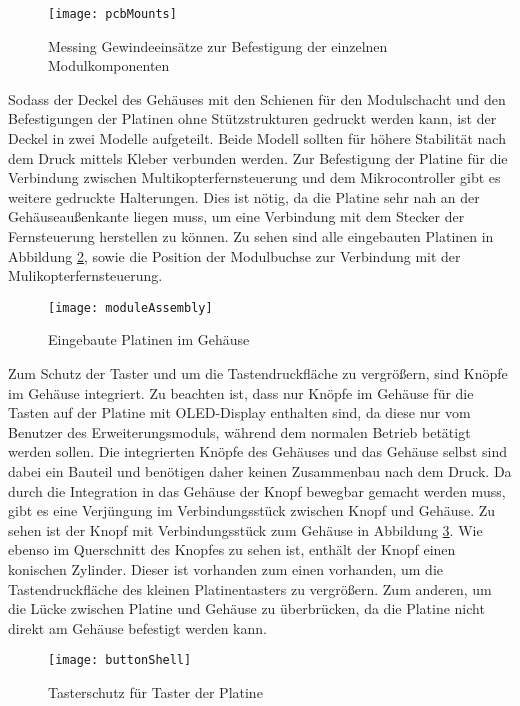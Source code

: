\begin{figure}[h]
    \centering
    \texttt{[image: pcbMounts]}
    \caption{Messing Gewindeeinsätze zur Befestigung der einzelnen Modulkomponenten}
    \label{fig:pcbMounts}
\end{figure}

Sodass der Deckel des Gehäuses mit den Schienen für den Modulschacht und den Befestigungen der Platinen ohne Stützstrukturen gedruckt werden kann, ist der Deckel in zwei Modelle aufgeteilt. Beide Modell sollten für höhere Stabilität nach dem Druck mittels Kleber verbunden werden. Zur Befestigung der Platine für die Verbindung zwischen Multikopterfernsteuerung und dem Mikrocontroller gibt es weitere gedruckte Halterungen. Dies ist nötig, da die Platine sehr nah an der Gehäuseaußenkante liegen muss, um eine Verbindung mit dem Stecker der Fernsteuerung herstellen zu können. Zu sehen sind alle eingebauten Platinen in Abbildung \ref{fig:moduleAssembly}, sowie die Position der Modulbuchse zur Verbindung mit der Mulikopterfernsteuerung.

\begin{figure}[h]
    \centering
    \texttt{[image: moduleAssembly]}
    \caption{Eingebaute Platinen im Gehäuse}
    \label{fig:moduleAssembly}
\end{figure}

Zum Schutz der Taster und um die Tastendruckfläche zu vergrößern, sind Knöpfe im Gehäuse integriert. Zu beachten ist, dass nur Knöpfe im Gehäuse für die Tasten auf der Platine mit \acs{OLED}-Display enthalten sind, da diese nur vom Benutzer des Erweiterungsmoduls, während dem normalen Betrieb betätigt werden sollen. Die integrierten Knöpfe des Gehäuses und das Gehäuse selbst sind dabei ein Bauteil und benötigen daher keinen Zusammenbau nach dem Druck. Da durch die Integration in das Gehäuse der Knopf bewegbar gemacht werden muss, gibt es eine Verjüngung im Verbindungsstück zwischen Knopf und Gehäuse. Zu sehen ist der Knopf mit Verbindungsstück zum Gehäuse in Abbildung \ref{fig:buttonShell}. Wie ebenso im Querschnitt des Knopfes zu sehen ist, enthält der Knopf einen konischen Zylinder. Dieser ist vorhanden zum einen vorhanden, um die Tastendruckfläche des kleinen Platinentasters zu vergrößern. Zum anderen, um die Lücke zwischen Platine und Gehäuse zu überbrücken, da die Platine nicht direkt am Gehäuse befestigt werden kann.

\begin{figure}[h]
    \centering
    \texttt{[image: buttonShell]}
    \caption{Tasterschutz für Taster der Platine}
    \label{fig:buttonShell}
\end{figure}

